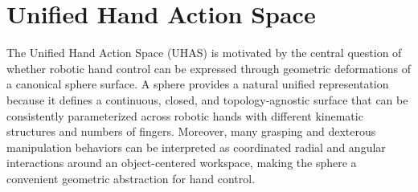 \vspace{-2mm}
\section{Unified Hand Action Space}
\vspace{-2mm}
\label{sec:method}



The Unified Hand Action Space (UHAS) is motivated by the central question of whether robotic hand control can be expressed through geometric deformations of a canonical sphere surface. A sphere provides a natural unified representation because it defines a continuous, closed, and topology-agnostic surface that can be consistently parameterized across robotic hands with different kinematic structures and numbers of fingers. Moreover, many grasping and dexterous manipulation behaviors can be interpreted as coordinated radial and angular interactions around an object-centered workspace, making the sphere a convenient geometric abstraction for hand control.







